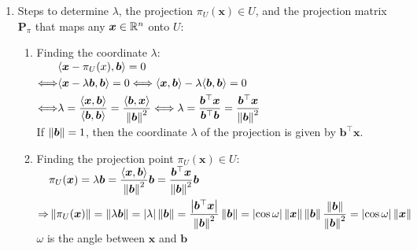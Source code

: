 \begin{enumerate}
    \item Steps to determine $\lambda$, the projection $\pi _U (\bm{x}) \in  U$, and the projection matrix $\bm{P}_ \pi $ that maps any $\bm{x} \in  \mathbb{R}^n$ onto $U$:
    \hfill \cite{mfml/book/mml/Deisenroth-Faisal-Ong}
    \begin{enumerate}
        \item Finding the coordinate $\lambda $:
        \hfill \cite{mfml/book/mml/Deisenroth-Faisal-Ong}
        \\
        $
            \begin{aligned}
                & \langle\bm{x} - \pi_ U (x), \bm{b}\rangle = 0
                \\
                \Longleftrightarrow &
                    \langle\bm{x} - \lambda \bm{b}, \bm{b}\rangle = 0
                    \Longleftrightarrow
                    \langle\bm{x}, \bm{b}\rangle - \lambda  \langle\bm{b}, \bm{b}\rangle = 0
                \\
                \Longleftrightarrow &
                    \lambda
                    = \dfrac{\langle\bm{x}, \bm{b}\rangle}{\langle\bm{b}, \bm{b}\rangle}
                    = \dfrac{\langle\bm{b}, \bm{x}\rangle}{\left\| \bm{b} \right\|^2}
                    \Longleftrightarrow
                    \lambda
                    =\dfrac{\bm{b}^\top \bm{x}}{\bm{b}^\top \bm{b}}
                    =\dfrac{\bm{b}^\top \bm{x}}{\left\| \bm{b} \right\|^2}
            \end{aligned}
        $
        \hfill \cite{mfml/book/mml/Deisenroth-Faisal-Ong}
        \\
        If $\left\| \bm{b} \right\| = 1$, then the coordinate $\lambda$ of the projection is given by $\bm{b}^\top \bm{x}$.
        \hfill \cite{mfml/book/mml/Deisenroth-Faisal-Ong}

        \item Finding the projection point $\pi_U (\bm{x}) \in U$:
        \hfill \cite{mfml/book/mml/Deisenroth-Faisal-Ong}
        \\
        $
            \begin{aligned}
                & \pi _U (\bm{x}) = \lambda  \bm{b}
                    = \dfrac{\langle\bm{x}, \bm{b}\rangle}{\left\| \bm{b} \right\|^2} \bm{b}
                    = \dfrac{\bm{b}^\top \bm{x}}{\left\| \bm{b} \right\|^2} \bm{b}
                \\
                \Rightarrow &
                    \left\| \pi _U (\bm{x}) \right\| = \left\| \lambda  \bm{b} \right\| = \left| \lambda \right| \left\| \bm{b} \right\|
                    = \dfrac{\left| \bm{b}^\top \bm{x} \right|}{\left\| \bm{b} \right\|^2} \left\| \bm{b} \right\|
                    = \left| \cos \omega \right| \left\| \bm{x} \right\| \left\| \bm{b} \right\| \dfrac{\left\| \bm{b} \right\|}{\left\| \bm{b} \right\|^2}
                    = \left| \cos \omega \right| \left\| \bm{x} \right\|
            \end{aligned}
        $
        \\
        $\omega$ is the angle between $\bm{x}$ and $\bm{b}$
        \hfill \cite{mfml/book/mml/Deisenroth-Faisal-Ong}


\end{enumerate}
\end{enumerate}
